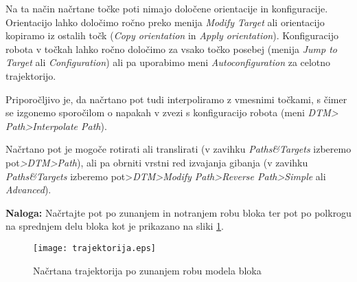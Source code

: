\begin{enumerate}
\begin{enumerate}
 \end{enumerate}
\end{enumerate}
\vspace{0.3cm}
 \noindent Na ta način načrtane točke poti nimajo
določene orientacije in konfiguracije. Orientacijo lahko določimo
ročno preko menija \emph{Modify Target} ali orientacijo kopiramo iz
ostalih točk (\emph{Copy orientation} in \emph{Apply orientation}).
Konfiguracijo robota v točkah lahko ročno določimo za vsako točko
posebej (menija \emph{Jump to Target} ali \emph{Configuration}) ali
pa uporabimo meni \emph{Autoconfiguration} za celotno trajektorijo.

\vspace{0.3cm} \noindent Priporočljivo je, da načrtano pot tudi
interpoliramo z vmesnimi točkami, s čimer se izgonemo sporočilom o
napakah v zvezi s konfiguracijo robota (meni \emph{DTM>
Path>Interpolate Path}).

\vspace{0.3cm} \noindent Načrtano pot je mogoče rotirati ali translirati (v
zavihku \emph{Paths\&Targets} izberemo pot\emph{>DTM>Path}), ali pa obrniti
vrstni red izvajanja gibanja  (v zavihku \emph{Paths\&Targets} izberemo
pot>\emph{DTM>Modify Path>Reverse Path>Simple} ali \emph{Advanced}).

\vspace{0.3cm}
 \noindent \textbf{Naloga:} Načrtajte pot po
zunanjem in notranjem robu bloka ter pot po polkrogu na sprednjem delu bloka kot je prikazano na sliki \ref{fig:trajektorije}.

\begin{figure}[h]
\centering
\texttt{[image: trajektorija.eps]}
  \caption{\label{fig:trajektorije} Načrtana trajektorija po zunanjem robu modela bloka}
\end{figure}


